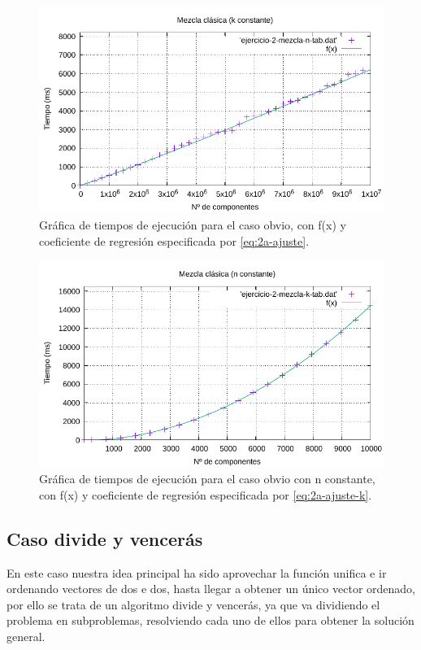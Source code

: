 \begin{figure}[h]
    \centering
    \includegraphics[scale=0.76]{img/e2a-graph.pdf}
    \caption{Gráfica de tiempos de ejecución para el caso obvio, 
    con f(x) y coeficiente de regresión especificada por \ref{eq:2a-ajuste}.}
    \label{fig:2a-obvio-n-graph}
\end{figure}

\begin{figure}[h]
	\centering
	\includegraphics[scale=0.76]{img/e2-obvio-k.pdf}
	\caption{Gráfica de tiempos de ejecución para el caso obvio con n constante, 
		con f(x) y coeficiente de regresión especificada por \ref{eq:2a-ajuste-k}.}
	\label{fig:2a-obvio-k-graph}
\end{figure}


\subsection{Caso divide y vencerás}

En este caso nuestra idea principal ha sido aprovechar la función unifica e ir ordenando vectores de dos e dos,
hasta llegar a obtener un único vector ordenado, por ello se trata de un algoritmo divide y vencerás, ya que va dividiendo 
el problema en subproblemas, resolviendo cada uno de ellos para obtener la solución general. 

